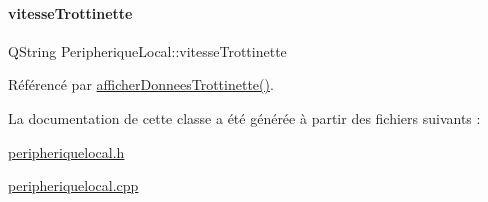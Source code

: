 \paragraph{\texorpdfstring{vitesse\+Trottinette}{vitesseTrottinette}}
{\footnotesize\ttfamily Q\+String Peripherique\+Local\+::vitesse\+Trottinette}



Référencé par \hyperlink{class_peripherique_local_a5702930929fea3e197fc1938a2303961}{afficher\+Donnees\+Trottinette()}.



La documentation de cette classe a été générée à partir des fichiers suivants \+:\begin{DoxyCompactItemize}
\item 
\hyperlink{peripheriquelocal_8h}{peripheriquelocal.\+h}\item 
\hyperlink{peripheriquelocal_8cpp}{peripheriquelocal.\+cpp}\end{DoxyCompactItemize}
